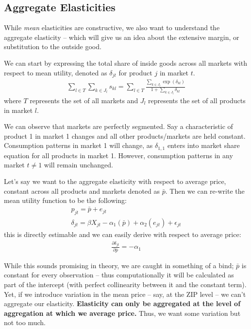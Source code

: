 \documentclass{article}
\begin{document}
\subsection{Aggregate Elasticities}
While \textit{mean} elasticities are constructive, we also want to understand the aggregate elasticity -- which will give us an idea about the extensive margin, or substitution to the outside good. 

We can start by expressing the total share of inside goods across all markets with respect to mean utility, denoted as $\delta_{jt}$ for product $j$ in market $t$. 
\begin{gather}
	\sum_{l \in T} \sum_{k \in J_l} s_{k l} = \sum_{l \in T} \frac{\sum_{k \in J_l} \exp(\delta_{k l})}{1 + \sum_{k \in J_l} \delta_{k l}}
\end{gather}
where $T$ represents the set of all markets and $J_l$ represents the set of all products in market $l$. 

We can observe that markets are perfectly segmented. Say a characteristic of product 1 in market 1 changes and all other products/markets are held constant. Consumption patterns in market 1 will change, as $\delta_{1, 1}$ enters into market share equation for all products in market 1. However, consumption patterns in any market $t \neq 1$ will remain unchanged. 

Let's say we want to the aggregate elasticity with respect to average price, constant across all products and markets denoted as $\bar{p}$. Then we can re-write the mean utility function to be the following:
\begin{gather}
	p_{jt} = \bar{p} + e_{jt} \\
	\delta_{jt} = \beta X_{jt} - \alpha_1 (\bar{p}) + \alpha_2 (e_{jt}) + \epsilon_{jt}
\end{gather}
this is directly estimable and we can easily derive with respect to average price:
\begin{gather}
	\frac{\partial \delta_{jt}}{\partial \bar{p}} = - \alpha_1
\end{gather}

While this sounds promising in theory, we are caught in something of a bind; $\bar{p}$ is constant for every observation -- thus computationally it will be calculated as part of the intercept (with perfect collinearity between it and the constant term). Yet, if we introduce variation in the mean price -- say, at the ZIP level -- we can't aggregate our elasticity. \textbf{Elasticity can only be aggregated at the level of aggregation at which we average price.} Thus, we want some variation but not too much. 
\end{document}
